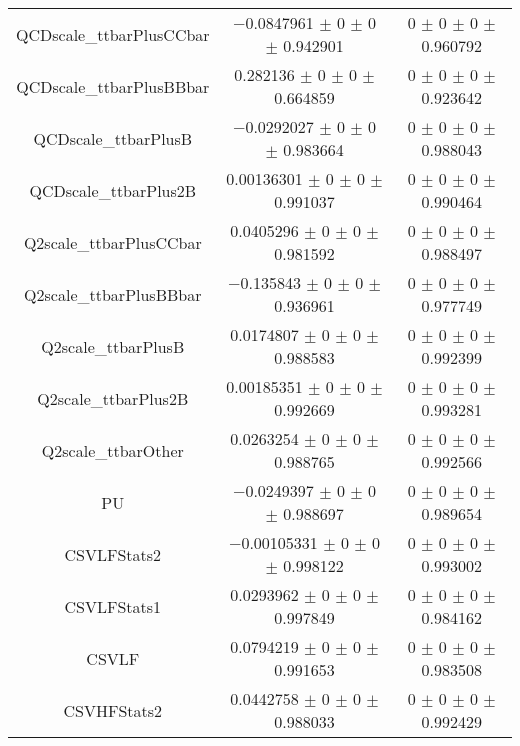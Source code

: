 \begin{table}
\begin{tabular}{ccc}
QCDscale\_ttbarPlusCCbar & \num{-0.0847961} $\pm$ \num{0} $\pm$ \num{0} $\pm$ \num{0.942901} & \num{0} $\pm$ \num{0} $\pm$ \num{0} $\pm$ \num{0.960792}\\
QCDscale\_ttbarPlusBBbar & \num{0.282136} $\pm$ \num{0} $\pm$ \num{0} $\pm$ \num{0.664859} & \num{0} $\pm$ \num{0} $\pm$ \num{0} $\pm$ \num{0.923642}\\
QCDscale\_ttbarPlusB & \num{-0.0292027} $\pm$ \num{0} $\pm$ \num{0} $\pm$ \num{0.983664} & \num{0} $\pm$ \num{0} $\pm$ \num{0} $\pm$ \num{0.988043}\\
QCDscale\_ttbarPlus2B & \num{0.00136301} $\pm$ \num{0} $\pm$ \num{0} $\pm$ \num{0.991037} & \num{0} $\pm$ \num{0} $\pm$ \num{0} $\pm$ \num{0.990464}\\
Q2scale\_ttbarPlusCCbar & \num{0.0405296} $\pm$ \num{0} $\pm$ \num{0} $\pm$ \num{0.981592} & \num{0} $\pm$ \num{0} $\pm$ \num{0} $\pm$ \num{0.988497}\\
Q2scale\_ttbarPlusBBbar & \num{-0.135843} $\pm$ \num{0} $\pm$ \num{0} $\pm$ \num{0.936961} & \num{0} $\pm$ \num{0} $\pm$ \num{0} $\pm$ \num{0.977749}\\
Q2scale\_ttbarPlusB & \num{0.0174807} $\pm$ \num{0} $\pm$ \num{0} $\pm$ \num{0.988583} & \num{0} $\pm$ \num{0} $\pm$ \num{0} $\pm$ \num{0.992399}\\
Q2scale\_ttbarPlus2B & \num{0.00185351} $\pm$ \num{0} $\pm$ \num{0} $\pm$ \num{0.992669} & \num{0} $\pm$ \num{0} $\pm$ \num{0} $\pm$ \num{0.993281}\\
Q2scale\_ttbarOther & \num{0.0263254} $\pm$ \num{0} $\pm$ \num{0} $\pm$ \num{0.988765} & \num{0} $\pm$ \num{0} $\pm$ \num{0} $\pm$ \num{0.992566}\\
PU & \num{-0.0249397} $\pm$ \num{0} $\pm$ \num{0} $\pm$ \num{0.988697} & \num{0} $\pm$ \num{0} $\pm$ \num{0} $\pm$ \num{0.989654}\\
CSVLFStats2 & \num{-0.00105331} $\pm$ \num{0} $\pm$ \num{0} $\pm$ \num{0.998122} & \num{0} $\pm$ \num{0} $\pm$ \num{0} $\pm$ \num{0.993002}\\
CSVLFStats1 & \num{0.0293962} $\pm$ \num{0} $\pm$ \num{0} $\pm$ \num{0.997849} & \num{0} $\pm$ \num{0} $\pm$ \num{0} $\pm$ \num{0.984162}\\
CSVLF & \num{0.0794219} $\pm$ \num{0} $\pm$ \num{0} $\pm$ \num{0.991653} & \num{0} $\pm$ \num{0} $\pm$ \num{0} $\pm$ \num{0.983508}\\
CSVHFStats2 & \num{0.0442758} $\pm$ \num{0} $\pm$ \num{0} $\pm$ \num{0.988033} & \num{0} $\pm$ \num{0} $\pm$ \num{0} $\pm$ \num{0.992429}\\

\end{tabular}
\end{table}
